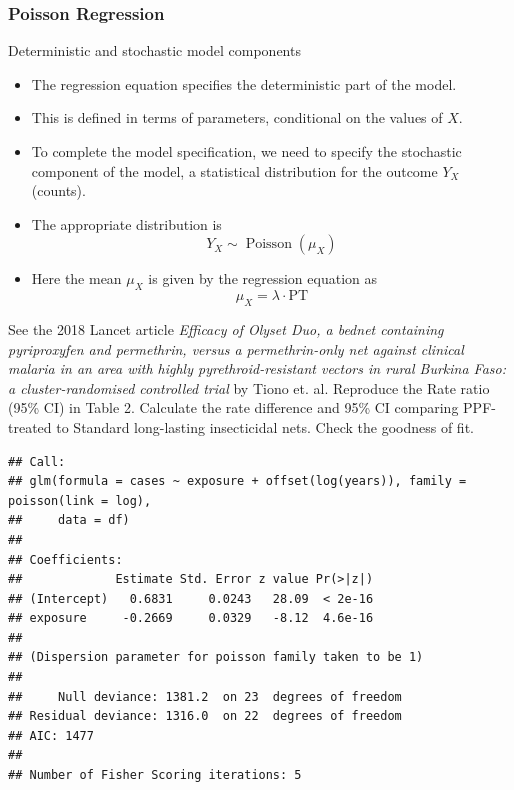 \documentclass[10pt,handout]{beamer}\usepackage[]{graphicx}\usepackage[]{color}
\makeatletter
\newenvironment{kframe}{%
 \def\at@end@of@kframe{}%
 \ifinner\ifhmode%
  \def\at@end@of@kframe{\end{minipage}}%
  \begin{minipage}{\columnwidth}%
 \fi\fi%
 \def\FrameCommand##1{\hskip\@totalleftmargin \hskip-\fboxsep
 \colorbox{shadecolor}{##1}\hskip-\fboxsep
     \hskip-\linewidth \hskip-\@totalleftmargin \hskip\columnwidth}%
 \MakeFramed {\advance\hsize-\width
   \@totalleftmargin\z@ \linewidth\hsize
   \@setminipage}}%
 {\par\unskip\endMakeFramed%
 \at@end@of@kframe}
\newenvironment{knitrout}{}{} %
\makeatother
\begin{document}
\subsubsection{Poisson Regression}
\begin{frame}{Deterministic and stochastic model components}
	\begin{itemize}
		\item 
		The regression equation specifies the deterministic part of the model.
		
		\item This is defined in terms of parameters, conditional on the values of $X$.
		
		\item To complete the model specification, we need to specify the stochastic component of the model, a statistical distribution for the outcome $Y_{X}$ (counts). 
		\item The appropriate distribution is
		$$
		Y_{X} \sim \operatorname{Poisson}\left(\mu_{X}\right)
		$$
		\item Here the mean $\mu_{X}$ is given by the regression equation as 
		$$
		\mu_{X}=\lambda \cdot \textrm{PT}
		$$
	\end{itemize}
\end{frame}

\begin{frame}
	\vspace*{-1.091in}
	\tiny
	See the 2018 Lancet article \textit{Efficacy of Olyset Duo, a bednet containing pyriproxyfen and permethrin, versus a permethrin-only net against clinical malaria in an area with highly pyrethroid-resistant vectors in rural Burkina Faso: a cluster-randomised controlled trial} by Tiono et. al. Reproduce the Rate ratio (95\% CI) in Table 2. Calculate the rate difference and 95\% CI comparing PPF-treated to Standard long-lasting insecticidal nets. Check the goodness of fit. 
	

	
	
\begin{knitrout}\tiny
{}\color{fgcolor}\begin{kframe}
\begin{verbatim}
## Call:
## glm(formula = cases ~ exposure + offset(log(years)), family = poisson(link = log), 
##     data = df)
## 
## Coefficients:
##             Estimate Std. Error z value Pr(>|z|)
## (Intercept)   0.6831     0.0243   28.09  < 2e-16
## exposure     -0.2669     0.0329   -8.12  4.6e-16
## 
## (Dispersion parameter for poisson family taken to be 1)
## 
##     Null deviance: 1381.2  on 23  degrees of freedom
## Residual deviance: 1316.0  on 22  degrees of freedom
## AIC: 1477
## 
## Number of Fisher Scoring iterations: 5
\end{verbatim}
\end{kframe}
\end{knitrout}
	
\end{frame}
\end{document}
